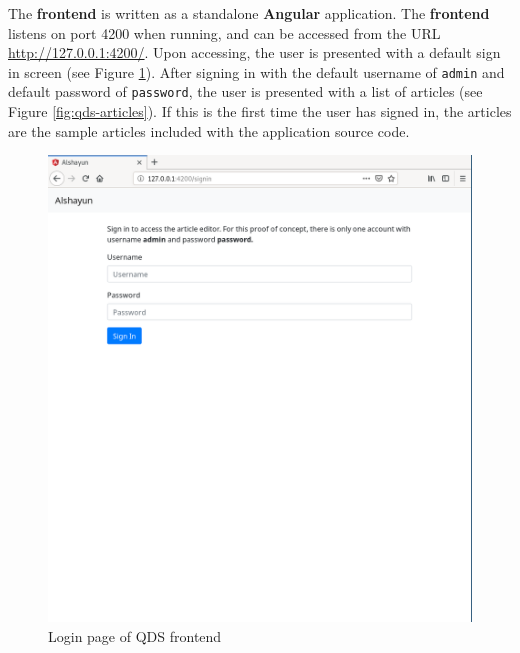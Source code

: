 \documentclass[12pt]{report}
\begin{document}
The \textbf{frontend} is written as a standalone \textbf{Angular} application.
The \textbf{frontend} listens on port 4200 when running, and can be accessed
from the URL \url{http://127.0.0.1:4200/}. Upon accessing, the user is presented
with a default sign in screen (see Figure \ref{fig:qds-login}). After signing in
with the default username of \texttt{admin} and default password of
\texttt{password}, the user is presented with a list of articles (see Figure
\ref{fig:qds-articles}). If this is the first time the user has signed in, the
articles are the sample articles included with the application source code.

\begin{figure}
    \centering
    \includegraphics[scale=0.4]{images/qds-login.png}
    \caption{Login page of QDS frontend}
    \label{fig:qds-login}
\end{figure}
\end{document}

